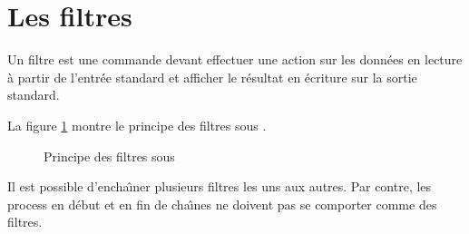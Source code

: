 \section{\label{bcpts-filters}Les filtres}

Un filtre est une commande {\Unix} devant effectuer une action sur
les donn{\'e}es en lecture {\`a} partir de l'entr{\'e}e standard et afficher le
r{\'e}sultat en {\'e}criture sur la sortie standard.

La figure \ref{fig-bcpts-filters-desc} montre le principe des filtres sous
{\Unix}.

\begin{figure}[hbtp]
\centering
{}
\caption{\label{fig-bcpts-filters-desc}Principe des filtres sous {\Unix}}
\end{figure}

Il est possible d'encha{\^\i}ner plusieurs filtres les uns aux autres. Par
contre, les process en d{\'e}but et en fin de cha{\^\i}nes ne doivent pas se
comporter comme des filtres.

